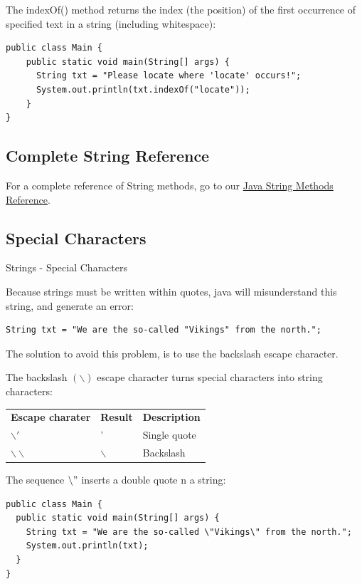 The indexOf() method returns the index (the position) of the first occurrence of specified text in a string (including whitespace): 

\begin{verbatim}
public class Main {
    public static void main(String[] args) {
      String txt = "Please locate where 'locate' occurs!";
      System.out.println(txt.indexOf("locate"));
    }
}  
\end{verbatim}

\subsection{Complete String Reference}

For a complete reference of String methods, go to our \href{https://www.w3schools.com/java/java_ref_string.asp}{Java String Methods Reference}. 

\subsection{Special Characters}

Strings - Special Characters

Because strings must be written within quotes, java will misunderstand this string, and generate an error: 

\begin{verbatim}
String txt = "We are the so-called "Vikings" from the north.";
\end{verbatim}

The solution to avoid this problem, is to use the backslash escape character.

The backslash $(\backslash)$ escape character turns special characters into string characters: 
\begin{center}
\begin{tabular}[t]{l l l}
         {\bf Escape charater}   & {\bf Result}   & {\bf  Description} \\
         $\backslash '$          &     '        & Single quote        \\
         $\backslash \backslash$  & $ \backslash$  & Backslash  \\
\end{tabular}
\end{center}

The sequence $\backslash" $ inserts a double quote n a string: 

\begin{verbatim}
public class Main {
  public static void main(String[] args) {
    String txt = "We are the so-called \"Vikings\" from the north.";
    System.out.println(txt);
  }
}
\end{verbatim}

